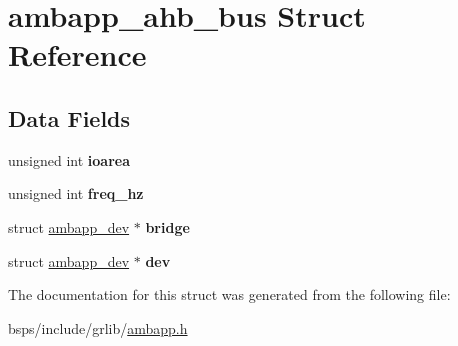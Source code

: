 \hypertarget{structambapp__ahb__bus}{}\section{ambapp\+\_\+ahb\+\_\+bus Struct Reference}
\label{structambapp__ahb__bus}
\subsection*{Data Fields}
\begin{DoxyCompactItemize}
\item 
\mbox{\label{structambapp__ahb__bus_abbc744acc8748a73b737222c76627a72}} 
unsigned int {\bfseries ioarea}
\item 
\mbox{\label{structambapp__ahb__bus_a0f74ff0aad9c0581c6584143ab67a3c2}} 
unsigned int {\bfseries freq\+\_\+hz}
\item 
\mbox{\label{structambapp__ahb__bus_a488580e9bc0338e40a7595d0765787bb}} 
struct \mbox{\hyperlink{structambapp__dev}{ambapp\+\_\+dev}} $\ast$ {\bfseries bridge}
\item 
\mbox{\label{structambapp__ahb__bus_a225fb73ebf7004d8f551de925efa91df}} 
struct \mbox{\hyperlink{structambapp__dev}{ambapp\+\_\+dev}} $\ast$ {\bfseries dev}
\end{DoxyCompactItemize}


The documentation for this struct was generated from the following file\+:\begin{DoxyCompactItemize}
\item 
bsps/include/grlib/\mbox{\hyperlink{ambapp_8h}{ambapp.\+h}}\end{DoxyCompactItemize}
